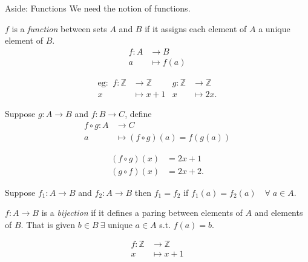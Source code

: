 \begin{aside}{Aside: Functions}
We need the notion of functions.
\begin{definition}[Function]
  \(f\) is a \emph{function} between sets \(A\) and \(B\) if it assigns each element of \(A\) a unique element of \(B\).
\begin{align*}
    f: A &\to B \\
    a &\mapsto f(a)
\end{align*}
\end{definition} 

\begin{example}
  \begin{align*}
    \text{eg: }\ f: \mathbb{Z} &\to \mathbb{Z} & g: \mathbb{Z} &\to \mathbb{Z} \\
    x &\mapsto x + 1 & x &\mapsto 2x.
  \end{align*}
\end{example} 

\begin{definition}
  Suppose \(g: A \to B\) and \(f: B \to C\), define
  \begin{align*}
    f \circ g: A &\to C \\
    a &\mapsto (f \circ g)(a) = f(g(a))
  \end{align*} 
\end{definition} 

\begin{example}
  \begin{align*}
    (f \circ g)(x) &= 2x + 1 \\
    (g \circ f)(x) &= 2x + 2.
  \end{align*} 
\end{example} 

Suppose \(f_1: A \to B\) and \(f_2: A \to B\) then \(f_1 = f_2\) if \(f_1(a) = f_2(a) \quad \forall \; a \in A\).

\begin{definition}
  \(f: A \to B\) is a \emph{bijection} if it defines a paring between elements of \(A\) and elements of \(B\). That is given \(b \in B \ \exists\) unique \(a \in A\) s.t. \(f(a) = b\).
\end{definition} 

\begin{example}
  \begin{align*}
    f: \mathbb{Z} &\to \mathbb{Z} \\
    x &\mapsto x + 1
  \end{align*}
\end{example} 


\end{aside}
